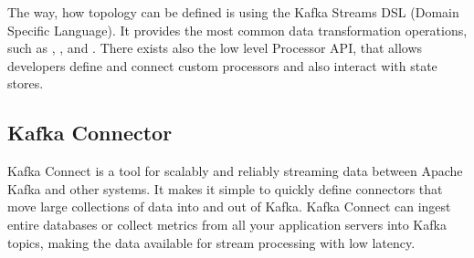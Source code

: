 The way, how topology can be defined is using the Kafka Streams DSL (Domain Specific Language).
It provides the most common data transformation operations, such as
, ,  and .
There exists also the low level Processor API, that allows developers define
and connect custom processors and also interact with state stores.




\subsection{Kafka Connector}

Kafka Connect is a tool for scalably and reliably streaming data between Apache Kafka
and other systems. It makes it simple to quickly define connectors that move
large collections of data into and out of Kafka.
Kafka Connect can ingest entire databases or collect metrics from all
your application servers into Kafka topics, making the data available
for stream processing with low latency.


